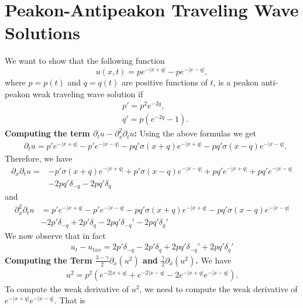 \documentclass[12pt,reqno]{amsart}
\numberwithin{equation}{section}  %
\numberwithin{figure}{section}
\newcommand{\medno}{\medskip\noindent}
\newcommand{\p}{\partial}
\theoremstyle{plain}  %
\theoremstyle{definition}
\begin{document}
\section{Peakon-Antipeakon Traveling Wave Solutions}
\label{sec:peakon-antipeakon}
We want to show that the following function
%
\begin{equation}
  \label{peakon-anti}
  u(x,t)= p e^{-| x + q |} - p e^{-| x-q |},
\end{equation}
%
where $p=p(t)$ and  $q=q(t)$ are positive functions of $t$,
is a peakon anti-peakon weak traveling wave solution if
%
\begin{align}
  &p' = p^2 e^{-2q}, \\
  &q' = p (e^{-2q} -1).
\end{align}
%
%
%
%
{\bf  Computing the term $\p_t u-\p_{x}^2\p_t u$:}  Using the above formulas we get
%
\begin{align*}
  &\p_t u
  =
  p'e^{-|x+q|} 
  - 
  p'e^{-|x-q|}
  -
  pq'\sigma(x+q)e^{-|x+q|}
  -
  pq'\sigma(x-q)e^{-|x-q|}.
\end{align*}
%
Therefore, we have 
%
\begin{align*}
  \p_x\p_t u
  = 
  &-p' \sigma(x+q) e^{-|x+q|}
  +
  p'\sigma(x-q)e^{-|x-q|} 
  + 
  pq'e^{-|x+q|} 
  +
  pq' e^{-|x-q|}\\
  &-
  2pq' \delta_{-q}
  -2pq'\delta_q
\end{align*}
%
and 
%
\begin{align*}
  \p_x^2\p_t u
  &=
  p'e^{-|x+q|}
  -
  p'e^{-|x-q|}
  -
  pq'\sigma(x+q)e^{-|x+q|}
  -
  pq'\sigma(x-q)e^{-|x-q|} \\
  &-2p' \delta_{-q} + 2p'\delta_q - 2pq'\delta_{-q}' - 2pq'\delta_q'
\end{align*}
%
We now observe that in fact
%
\begin{align}
  \label{deriv-t-term}
  u_t - u_{txx} = 2p' \delta_{-q} - 2p'\delta_q + 2pq'\delta_{-q}' + 2pq'\delta_q'
\end{align}
%
\medno
{\bf Computing the Term $\displaystyle \frac{3-\gamma}{2} \p_x (u^{2})$ and
$\displaystyle \frac{\gamma}{2} \p_x (u^{2})$.}
We have
%
%
\begin{equation*}
  \begin{split}
    u^{2} = p^{2}\left( e^{-2| x+q |} + e^{-2| x-q |} - 2e^{-| x+q
    |}e^{-| x-q |} \right).
  \end{split}
\end{equation*}
%
%
To compute the weak derivative of $u^{2}$, we need to compute the weak
derivative of $e^{-| x+q |}e^{-| x-q |}$. That is
\end{document}
